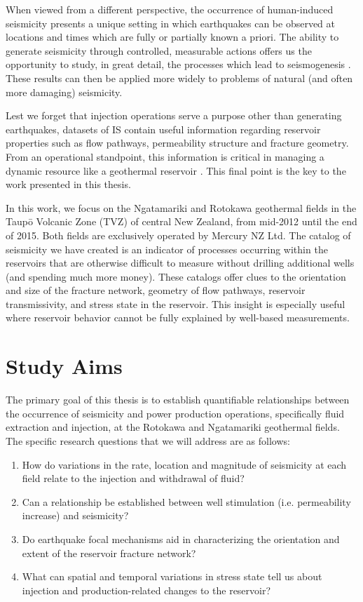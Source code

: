 When viewed from a different perspective, the occurrence of human-induced seismicity presents a unique setting in which earthquakes can be observed at locations and times which are fully or partially known a priori. The ability to generate seismicity through controlled, measurable actions  offers us the opportunity to study, in great detail, the processes which lead to seismogenesis \citep[e.g.][]{Raleigh_1976}. These results can then be applied more widely to problems of natural (and often more damaging) seismicity.

Lest we forget that injection operations serve a purpose other than generating earthquakes, datasets of IS contain useful information regarding reservoir properties such as flow pathways, permeability structure and fracture geometry. From an operational standpoint, this information is critical in managing a dynamic resource like a geothermal reservoir \citep{Majer_2007}. This final point is the key to the work presented in this thesis.

In this work, we focus on the Ngatamariki and Rotokawa geothermal fields in the Taup\={o} Volcanic Zone (TVZ) of central New Zealand, from mid-2012 until the end of 2015. Both fields are exclusively operated by Mercury NZ Ltd. The catalog of seismicity we have created is an indicator of processes occurring within the reservoirs that are otherwise difficult to measure without drilling additional wells (and spending much more money). These catalogs offer clues to the orientation and size of the fracture network, geometry of flow pathways, reservoir transmissivity, and stress state in the reservoir. This insight is especially useful where reservoir behavior cannot be fully explained by well-based measurements.

\section{Study Aims}
The primary goal of this thesis is to establish quantifiable relationships between the occurrence of seismicity and power production operations, specifically fluid extraction and injection, at the Rotokawa and Ngatamariki geothermal fields. The specific research questions that we will address are as follows:

\begin{enumerate}
  \item{How do variations in the rate, location and magnitude of seismicity at each field relate to the injection and withdrawal of fluid?}
  \item{Can a relationship be established between well stimulation (i.e. permeability increase) and seismicity?}
  \item{Do earthquake focal mechanisms aid in characterizing the orientation and extent of the reservoir fracture network?}
  \item{What can spatial and temporal variations in stress state tell us about injection and production-related changes to the reservoir?}
\end{enumerate}

